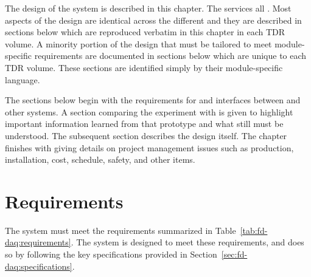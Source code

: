 The design of the    system is described in this chapter.  The  services all  .  Most  aspects of the design are identical across the different  and they are described in sections below which are reproduced verbatim in this  chapter in each  TDR volume.  A minority portion of the  design that must be tailored to meet module-specific requirements are documented in sections below which are unique to each  TDR volume.  These sections are identified simply by their module-specific language.

The sections below begin with the requirements for and interfaces between  and other  systems.  A section comparing the  experiment with  is given to highlight important information learned from that prototype and what still must be understood.  The subsequent section describes the design itself.  The chapter finishes with giving details on project management issues such as production, installation, cost, schedule, safety, and other items.

\section{Requirements}
\label{sec:fd-daq:requirements}


The    system must meet the requirements 
summarized in Table~\ref{tab:fd-daq:requirements}. The system is
designed to meet these requirements, and does so by following the key
specifications provided in Section~\ref{sec:fd-daq:specifications}. 

% 



